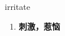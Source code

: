 
\begin{frame}
{\huge irritate}
\begin{center}
\begin{enumerate}\Large
  \item \textbf{刺激，惹恼}
\end{enumerate}
\end{center}
\end{frame}
